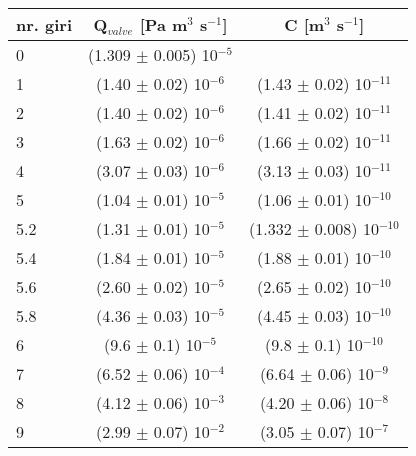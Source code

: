 \begin{center}
	\begin{tabular}{ l c c }
        \toprule
        nr. giri & Q$_{valve}$ [Pa m$^3$ s$^{-1}$] & C [m$^3$ s$^{-1}$] \\ 
        \midrule
        0   & (1.309 $\pm$ 0.005) 10$^{-5}$ & \\
        1   & (1.40 $\pm$ 0.02) 10$^{-6}$ & (1.43 $\pm$  0.02) 10$^{-11}$ \\
        2   & (1.40 $\pm$ 0.02) 10$^{-6}$ & (1.41 $\pm$  0.02) 10$^{-11}$ \\
        3   & (1.63 $\pm$ 0.02) 10$^{-6}$ & (1.66 $\pm$  0.02) 10$^{-11}$ \\
        4   & (3.07 $\pm$ 0.03) 10$^{-6}$ & (3.13 $\pm$  0.03) 10$^{-11}$ \\
        5   & (1.04 $\pm$ 0.01) 10$^{-5}$ & (1.06 $\pm$  0.01) 10$^{-10}$ \\
        5.2 & (1.31 $\pm$ 0.01) 10$^{-5}$ & (1.332 $\pm$ 0.008) 10$^{-10}$ \\
        5.4 & (1.84 $\pm$ 0.01) 10$^{-5}$ & (1.88 $\pm$  0.01) 10$^{-10}$ \\
        5.6 & (2.60 $\pm$ 0.02) 10$^{-5}$ & (2.65 $\pm$  0.02) 10$^{-10}$ \\
        5.8 & (4.36 $\pm$ 0.03) 10$^{-5}$ & (4.45 $\pm$  0.03) 10$^{-10}$ \\
        6   &  (9.6 $\pm$ 0.1)  10$^{-5}$ & (9.8 $\pm$   0.1) 10$^{-10}$ \\
        7   & (6.52 $\pm$ 0.06) 10$^{-4}$ & (6.64 $\pm$  0.06) 10$^{-9}$ \\
        8   & (4.12 $\pm$ 0.06) 10$^{-3}$ & (4.20 $\pm$  0.06) 10$^{-8}$ \\
        9   & (2.99 $\pm$ 0.07) 10$^{-2}$ & (3.05 $\pm$  0.07) 10$^{-7}$ \\
    \bottomrule

	\end{tabular}
\end{center}
